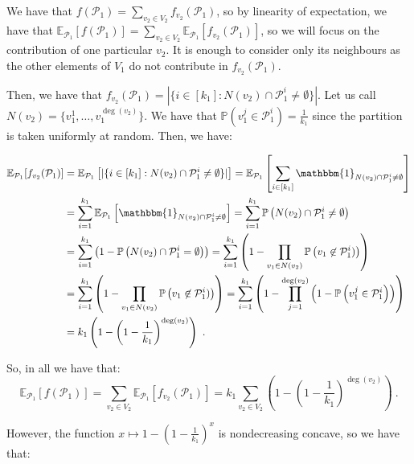\documentclass[11pt]{article}
\theoremstyle{definition}
\theoremstyle{remark}
\begin{document}
We have that $f(\mathcal{P}_1)=\sum_{v_2 \in V_2}f_{v_2}(\mathcal{P}_1)$, so by linearity of expectation, we have that $\mathbb{E}_{\mathcal{P}_1}[f(\mathcal{P}_1)] = \sum_{v_2 \in V_2}\mathbb{E}_{\mathcal{P}_1}[f_{v_2}(\mathcal{P}_1)]$, so we will focus on the contribution of one particular $v_2$. It is enough to consider only its neighbours as the other elements of $V_1$ do not contribute in $f_{v_2}(\mathcal{P}_1)$.

Then, we have that $f_{v_2}(\mathcal{P}_1)=|\{i \in [k_1]: N(v_2) \cap \mathcal{P}_1^i \not= \emptyset  \}|$. Let us call $N(v_2) = \{v_1^1, \ldots, v_1^{\deg(v_2)}\}$. We have that $\mathbb{P}\left(v_1^j \in \mathcal{P}_1^i\right) = \frac{1}{k_1}$ since the partition is taken uniformly at random. Then, we have:

\begin{equation}
  \begin{aligned}
    \mathbb{E}_{\mathcal{P}_1}[f_{v_2}(\mathcal{P}_1)] &= \mathbb{E}_{\mathcal{P}_1}\left[|\{i \in [k_1]: N(v_2) \cap \mathcal{P}_1^i \not= \emptyset  \}|\right]
    = \mathbb{E}_{\mathcal{P}_1}\left[\sum_{i \in [k_1]} \mathbbm{1}_{N(v_2) \cap \mathcal{P}_1^i \not= \emptyset}\right]\\
    &= \sum_{i = 1}^{k_1} \mathbb{E}_{\mathcal{P}_1}\left[\mathbbm{1}_{N(v_2) \cap \mathcal{P}_1^i \not= \emptyset}\right]
    = \sum_{i = 1}^{k_1}\mathbb{P}\left(N(v_2) \cap \mathcal{P}_1^i \not= \emptyset\right)\\
    &= \sum_{i = 1}^{k_1}\left(1 - \mathbb{P}\left(N(v_2) \cap \mathcal{P}_1^i = \emptyset\right)\right)
    = \sum_{i = 1}^{k_1}\left(1 - \prod_{v_1 \in N(v_2)}\mathbb{P}\left(v_1 \not\in \mathcal{P}_1^i)\right)\right)\\
    &= \sum_{i = 1}^{k_1}\left(1 - \prod_{v_1 \in N(v_2)}\mathbb{P}\left(v_1 \not\in \mathcal{P}_1^i)\right)\right) =\sum_{i = 1}^{k_1}\left(1 - \prod_{j = 1}^{\deg(v_2)}\left(1- \mathbb{P}\left(v_1^j \in \mathcal{P}_1^i\right)\right)\right)\\
    &= k_1\left(1-\left(1-\frac{1}{k_1}\right)^{\deg(v_2)}\right) \ .
  \end{aligned}
\end{equation}

So, in all we have that:
\[ \mathbb{E}_{\mathcal{P}_1}[f(\mathcal{P}_1)] = \sum_{v_2 \in V_2}\mathbb{E}_{\mathcal{P}_1}[f_{v_2}(\mathcal{P}_1)] = k_1\sum_{v_2 \in V_2}\left(1-\left(1-\frac{1}{k_1}\right)^{\deg(v_2)}\right) \ . \]

However, the function $x \mapsto 1-\left(1-\frac{1}{k_1}\right)^x$ is nondecreasing concave, so we have that:
\end{document}
